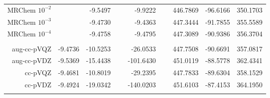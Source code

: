 \documentclass[a0,portrait]{a0poster}
\begin{document}
\begin{textblock}{7}
\begin{table}
\begin{tabular}{|r|crr|ccc|}
	MRChem $10^{-2}$ &               &  -9.5497\ \ \ &  -9.9222\ \ \ &  446.7869     &  -96.6166     &  350.1703     \\
	MRChem $10^{-3}$ &               &  -9.4730\ \ \ &  -9.4363\ \ \ &  447.3444     &  -91.7855     &  355.5589     \\
	MRChem $10^{-4}$ &               &  -9.4758\ \ \ &  -9.4795\ \ \ &  447.3089     &  -90.9386     &  356.3704     \\
	                 &               &               &               &               &               &               \\
	aug-cc-pVQZ      & -9.4736       & -10.5253\ \ \ & -26.0533\ \ \ &  447.7508     &  -90.6691     &  357.0817     \\
	aug-cc-pVDZ      & -9.5369       & -15.4438\ \ \ &-101.6430\ \ \ &  451.0119     &  -88.5778     &  362.4341     \\
	    cc-pVQZ      & -9.4681       & -10.8019\ \ \ & -29.2395\ \ \ &  447.7833     &  -89.6304     &  358.1529     \\
	    cc-pVDZ      & -9.4924       & -19.0342\ \ \ &-140.0203\ \ \ &  451.6103     &  -87.4153     &  364.1950     \\
	                 &               &               &               &               &               &               \\
	\hline
	\end{tabular}
    \end{table}
\end{textblock}
\end{document}
